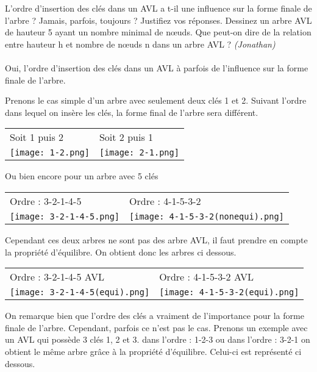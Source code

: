 L'ordre d'insertion des clés dans un AVL a t-il une influence sur la forme finale de l'arbre ?
Jamais, parfois, toujours ? Justifiez vos réponses.
Dessinez un arbre AVL de hauteur 5 ayant un nombre minimal de nœuds. Que peut-on
dire de la relation entre hauteur h et nombre de nœuds n dans un arbre AVL ? \textit{(Jonathan)} \\
\\ Oui, l'ordre d'insertion des clés dans un AVL à parfois de l'influence sur la forme finale de l'arbre.

Prenons le cas simple d'un arbre avec seulement deux clés 1 et 2.
Suivant l'ordre dans lequel on insère les clés, la forme final de l'arbre sera différent.
\\

\begin{tabular}{ll}
    Soit 1 puis 2 & Soit 2 puis 1 \\
   \texttt{[image: 1-2.png]} & \texttt{[image: 2-1.png]} \\


\end{tabular}

Ou bien encore pour un arbre avec 5 clés \\

\begin{tabular}{ll}
  Ordre : 3-2-1-4-5 & Ordre : 4-1-5-3-2 \\ \texttt{[image: 3-2-1-4-5.png]} & \texttt{[image: 4-1-5-3-2(nonequi).png]} \\
  
\end{tabular}

Cependant ces deux arbres ne sont pas des arbre AVL, il faut prendre en compte la propriété d'équilibre. On obtient donc les arbres ci dessous.\\

\begin{tabular}{ll}
  Ordre : 3-2-1-4-5 AVL & Ordre : 4-1-5-3-2 AVL \\ \texttt{[image: 3-2-1-4-5(equi).png]} & \texttt{[image: 4-1-5-3-2(equi).png]} \\
  
\end{tabular}

On remarque bien que l'ordre des clés a vraiment de l'importance pour la forme finale de l'arbre. Cependant, parfois ce n'est pas le cas. Prenons un exemple avec un AVL qui possède 3 clés 1, 2 et 3.
dans l'ordre : 1-2-3 ou dans l'ordre : 3-2-1 on obtient le même arbre grâce à la propriété d'équilibre. Celui-ci est représenté ci dessous.
 

